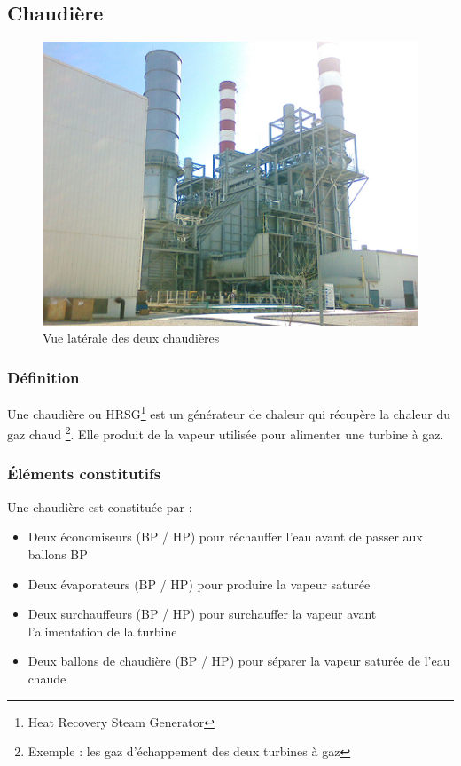 \subsection{Chaudière}
\begin{figure}[hbtp]
\centering
\includegraphics[scale=1]{./Figures/chaudiere.png}
\caption{Vue latérale des deux chaudières}
\end{figure}

\subsubsection{Définition}
Une chaudière ou HRSG\footnote{Heat Recovery Steam Generator} est un générateur de chaleur qui récupère la chaleur du gaz chaud \footnote{Exemple : les gaz d'échappement des deux turbines à gaz}. Elle produit de la vapeur utilisée pour alimenter une turbine à gaz.
\subsubsection{Éléments constitutifs}
Une chaudière est constituée par :

\begin{itemize}
\item Deux économiseurs (BP / HP) pour réchauffer l'eau avant de passer aux ballons BP
\item Deux évaporateurs (BP / HP) pour produire la vapeur saturée
\item Deux surchauffeurs (BP / HP) pour surchauffer la vapeur avant l'alimentation de la turbine
\item Deux ballons de chaudière (BP / HP) pour séparer la vapeur saturée de l'eau chaude

\end{itemize} 
